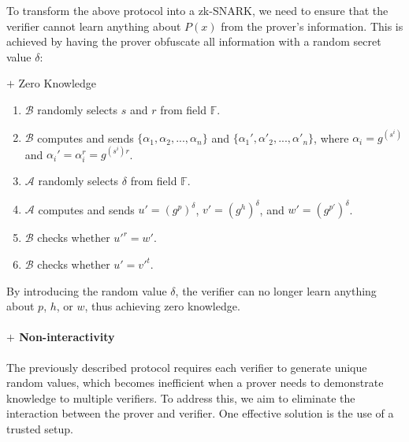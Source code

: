 \documentclass{article}
\begin{document}
To transform the above protocol into a zk-SNARK, we need to ensure that the verifier cannot learn anything about $P(x)$ from the prover's information. This is achieved by having the prover obfuscate all information with a random secret value $\delta$:

\begin{protocol}{$+$ Zero Knowledge}{}
\begin{enumerate}
    \item $\mathcal{B}$ randomly selects $s$ and $r$ from field $\mathbb{F}$.
    \item $\mathcal{B}$ computes and sends $\{\alpha_1, \alpha_2, ..., \alpha_{n}\}$ and $\{\alpha_1', \alpha'_2, ..., \alpha'_{n}\}$, where $\alpha_i = g^{(s^{i})}$ and $\alpha_i' = \alpha_i^{r} = g^{(s^{i})r}$.
    \item $\mathcal{A}$ randomly selects $\delta$ from field $\mathbb{F}$.
    \item $\mathcal{A}$ computes and sends $u' = (g^{p})^{\delta}$, $v' = (g^{h})^{\delta}$, and $w' = (g^{p'})^{\delta}$.
    \item $\mathcal{B}$ checks whether $u'^{r} = w'$.
    \item $\mathcal{B}$ checks whether $u' = v'^{t}$.
\end{enumerate}
\end{protocol}

By introducing the random value $\delta$, the verifier can no longer learn anything about $p$, $h$, or $w$, thus achieving zero knowledge.

\paragraph{$+$ Non-interactivity}

The previously described protocol requires each verifier to generate unique random values, which becomes inefficient when a prover needs to demonstrate knowledge to multiple verifiers. To address this, we aim to eliminate the interaction between the prover and verifier. One effective solution is the use of a trusted setup.
\end{document}
